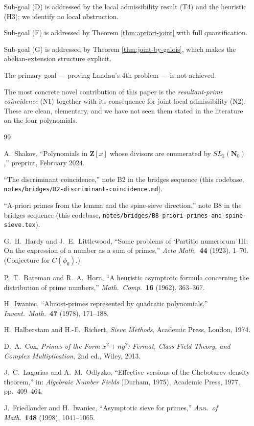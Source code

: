 \documentclass[11pt]{article}
\theoremstyle{definition}
\newcommand{\Nz}{\mathbf{N}_0}
\newcommand{\Z}{\mathbf{Z}}
\newcommand{\SLNz}{SL_2(\Nz)}
\begin{document}
Sub-goal (D) is addressed by the local admissibility result (T4) and the heuristic (H3); we identify no local obstruction.

Sub-goal (F) is addressed by Theorem \ref{thm:apriori-joint} with full quantification.

Sub-goal (G) is addressed by Theorem \ref{thm:joint-by-galois}, which makes the abelian-extension structure explicit.

The primary goal --- proving Landau's 4th problem --- is not achieved.

The most concrete novel contribution of this paper is the \emph{resultant-prime coincidence} (N1) together with its consequence for joint local admissibility (N2). These are clean, elementary, and we have not seen them stated in the literature on the four polynomials.

\begin{thebibliography}{99}

A.\ Shakov,
``Polynomials in $\Z[x]$ whose divisors are enumerated by $\SLNz$,''
preprint, February 2024.

``The discriminant coincidence,''
note B2 in the bridges sequence (this codebase, \texttt{notes/bridges/B2-discriminant-coincidence.md}).

``A-priori primes from the lemma and the spine-sieve direction,''
note B8 in the bridges sequence (this codebase, \texttt{notes/bridges/B8-priori-primes-and-spine-sieve.tex}).

G.\ H.\ Hardy and J.\ E.\ Littlewood,
``Some problems of `Partitio numerorum'\,III: On the expression of a number as a sum of primes,''
\emph{Acta Math.}~\textbf{44} (1923), 1--70. (Conjecture for $C(\phi_0)$.)

P.\ T.\ Bateman and R.\ A.\ Horn,
``A heuristic asymptotic formula concerning the distribution of prime numbers,''
\emph{Math.\ Comp.}~\textbf{16} (1962), 363--367.

H.\ Iwaniec,
``Almost-primes represented by quadratic polynomials,''
\emph{Invent.\ Math.}~\textbf{47} (1978), 171--188.

H.\ Halberstam and H.-E.\ Richert,
\emph{Sieve Methods},
Academic Press, London, 1974.

D.\ A.\ Cox,
\emph{Primes of the Form $x^2+ny^2$: Fermat, Class Field Theory, and Complex Multiplication},
2nd ed., Wiley, 2013.

J.\ C.\ Lagarias and A.\ M.\ Odlyzko,
``Effective versions of the Chebotarev density theorem,''
in: \emph{Algebraic Number Fields} (Durham, 1975), Academic Press, 1977, pp.~409--464.

J.\ Friedlander and H.\ Iwaniec,
``Asymptotic sieve for primes,''
\emph{Ann.\ of Math.}~\textbf{148} (1998), 1041--1065.

\end{thebibliography}
\end{document}
